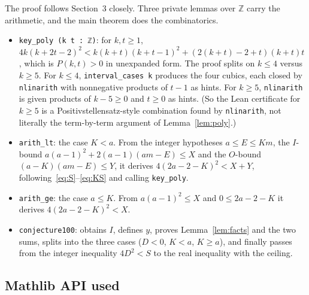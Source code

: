 \documentclass[11pt]{article}
\theoremstyle{definition}
\theoremstyle{remark}
\begin{document}
The proof follows Section~3 closely. Three private lemmas over $\mathbb{Z}$
carry the arithmetic, and the main theorem does the combinatorics.

\begin{itemize}
\item \texttt{key\_poly (k t : ℤ)}: for $k, t \ge 1$,
  $4k(k + 2t - 2)^2 < k(k+t)(k+t-1)^2 + (2(k+t) - 2 + t)(k+t)t$, which is
  $P(k,t) > 0$ in unexpanded form. The proof splits on $k \le 4$ versus
  $k \ge 5$. For $k \le 4$, \texttt{interval\_cases k} produces the four
  cubics, each closed by \texttt{nlinarith} with nonnegative products of
  $t-1$ as hints. For $k \ge 5$, \texttt{nlinarith} is given products of
  $k-5 \ge 0$ and $t \ge 0$ as hints. (So the Lean certificate for $k \ge 5$
  is a Positivstellensatz-style combination found by \texttt{nlinarith}, not
  literally the term-by-term argument of Lemma~\ref{lem:poly}.)
\item \texttt{arith\_lt}: the case $K < a$. From the integer hypotheses
  $a \le E \le Km$, the $I$-bound
  $a(a-1)^2 + 2(a-1)(am-E) \le X$ and the $O$-bound $(a-K)(am-E) \le Y$, it
  derives $4(2a-2-K)^2 < X + Y$, following~\eqref{eq:S}--\eqref{eq:KS} and
  calling \texttt{key\_poly}.
\item \texttt{arith\_ge}: the case $a \le K$. From $a(a-1)^2 \le X$ and
  $0 \le 2a-2-K$ it derives $4(2a-2-K)^2 < X$.
\item \texttt{conjecture100}: obtains $I$, defines $y$, proves
  Lemma~\ref{lem:facts} and the two sums, splits into the three cases
  ($D < 0$, $K < a$, $K \ge a$), and finally passes from the integer
  inequality $4D^2 < S$ to the real inequality with the ceiling.
\end{itemize}

\subsection{Mathlib API used}
\end{document}
